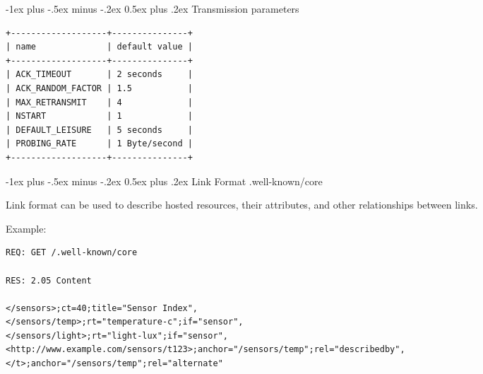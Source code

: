 \documentclass[10pt,landscape]{article}
\makeatletter
\renewcommand{\section}{\@startsection{section}{1}{0mm}%
                                {-1ex plus -.5ex minus -.2ex}%
                                {0.5ex plus .2ex}%
                                {\normalfont\large\bfseries}}
\makeatother
\begin{document}
\begin{multicols}{3}
\section{Transmission parameters}
{\tiny
\begin{verbatim}
+-------------------+---------------+
| name              | default value |
+-------------------+---------------+
| ACK_TIMEOUT       | 2 seconds     |
| ACK_RANDOM_FACTOR | 1.5           |
| MAX_RETRANSMIT    | 4             |
| NSTART            | 1             |
| DEFAULT_LEISURE   | 5 seconds     |
| PROBING_RATE      | 1 Byte/second |
+-------------------+---------------+
\end{verbatim}
}

\section{Link Format .well-known/core}

Link format can be used to describe hosted resources, their
attributes, and other relationships between links.

Example:
{\tiny
\begin{verbatim}
REQ: GET /.well-known/core

RES: 2.05 Content

</sensors>;ct=40;title="Sensor Index",
</sensors/temp>;rt="temperature-c";if="sensor",
</sensors/light>;rt="light-lux";if="sensor",
<http://www.example.com/sensors/t123>;anchor="/sensors/temp";rel="describedby",
</t>;anchor="/sensors/temp";rel="alternate"
\end{verbatim}
}


\end{multicols}
\end{document}
